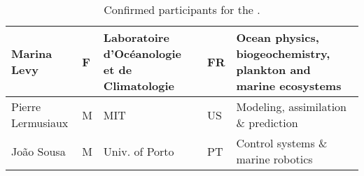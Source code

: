 \begin{table}[!t]
{\begin{tabular}{|p{3.5cm}|p{0.7cm}|p{4.0cm}|p{0.5cm}|p{6.0cm}|}
  \hline
  Marina Levy              & F   & Laboratoire d'Oc\'{e}anologie et de Climatologie    & FR       & Ocean physics, biogeochemistry, plankton and marine ecosystems\\
  \hline
  Pierre Lermusiaux        & M   & MIT & US       &Modeling, assimilation \& prediction\\
  \hline
  Jo\~ao Sousa               & M   & Univ. of Porto & PT       &
                                                                 Control systems \& marine robotics\\
                                                                 \hline
\end{tabular}
}
\caption{Confirmed participants for the \sympe.}
\label{tab:part}
\end{table}
